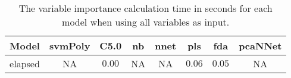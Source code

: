 \begin{table}[!ht]
	\centering
	\begin{tabular}{|c|c|c|c|c|c|c|c|}
		\hline
		Model & svmPoly & C5.0 & nb & nnet & pls & fda & pcaNNet \\ \hline
		elapsed & NA & $0.00$ & NA & NA & $0.06$ & $0.05$ & NA \\ \hline
	\end{tabular}
	\caption{The variable importance calculation time in seconds for each model when using all variables as input.}
	\label{tab:time:reverse:all:importance}
\end{table}
